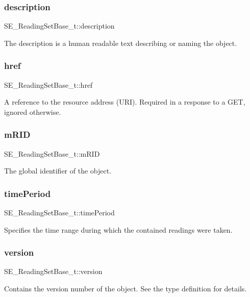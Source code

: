 \subsubsection{\texorpdfstring{description}{description}}
{\footnotesize\ttfamily S\+E\+\_\+\+Reading\+Set\+Base\+\_\+t\+::description}

The description is a human readable text describing or naming the object. \mbox{\label{group__ReadingSetBase_ga4c94838462ed93e356089d894b4b408d}} 
\subsubsection{\texorpdfstring{href}{href}}
{\footnotesize\ttfamily S\+E\+\_\+\+Reading\+Set\+Base\+\_\+t\+::href}

A reference to the resource address (U\+RI). Required in a response to a G\+ET, ignored otherwise. \mbox{\label{group__ReadingSetBase_ga7189226865c8cc699d86933793edbe14}} 
\subsubsection{\texorpdfstring{m\+R\+ID}{mRID}}
{\footnotesize\ttfamily S\+E\+\_\+\+Reading\+Set\+Base\+\_\+t\+::m\+R\+ID}

The global identifier of the object. \mbox{\label{group__ReadingSetBase_ga4da03480f642318baf9793c7ff5e1006}} 
\subsubsection{\texorpdfstring{time\+Period}{timePeriod}}
{\footnotesize\ttfamily S\+E\+\_\+\+Reading\+Set\+Base\+\_\+t\+::time\+Period}

Specifies the time range during which the contained readings were taken. \mbox{\label{group__ReadingSetBase_gacf87694263f9fa1022f9d5a28d2eb694}} 
\subsubsection{\texorpdfstring{version}{version}}
{\footnotesize\ttfamily S\+E\+\_\+\+Reading\+Set\+Base\+\_\+t\+::version}

Contains the version number of the object. See the type definition for details. 